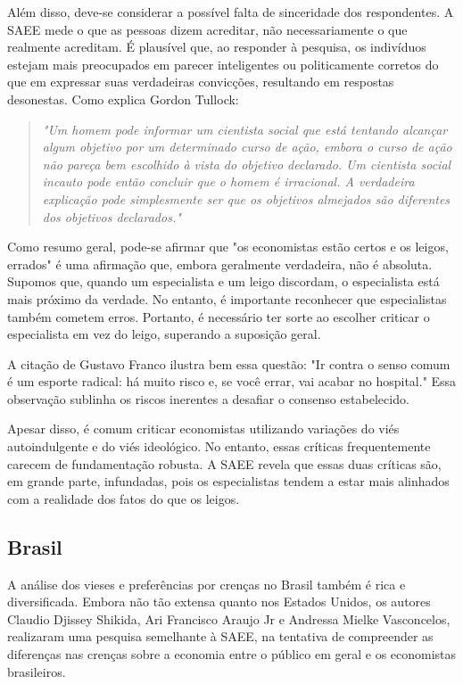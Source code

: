 Além disso, deve-se considerar a possível falta de sinceridade dos respondentes. A SAEE mede o que as pessoas dizem acreditar, não necessariamente o que realmente acreditam. É plausível que, ao responder à pesquisa, os indivíduos estejam mais preocupados em parecer inteligentes ou politicamente corretos do que em expressar suas verdadeiras convicções, resultando em respostas desonestas. Como explica Gordon Tullock:

\begin{quote}
    \textit{
        "Um homem pode informar um cientista social que está tentando alcançar algum objetivo por um determinado curso de ação, embora o curso de ação não pareça bem escolhido à vista do objetivo declarado. Um cientista social incauto pode então concluir que o homem é irracional. A verdadeira explicação pode simplesmente ser que os objetivos almejados são diferentes dos objetivos declarados."
    }
    \cite{tullock1987politics}
\end{quote}

Como resumo geral, pode-se afirmar que "os economistas estão certos e os leigos, errados" é uma afirmação que, embora geralmente verdadeira, não é absoluta. Supomos que, quando um especialista e um leigo discordam, o especialista está mais próximo da verdade. No entanto, é importante reconhecer que especialistas também cometem erros. Portanto, é necessário ter sorte ao escolher criticar o especialista em vez do leigo, superando a suposição geral.

A citação de Gustavo Franco ilustra bem essa questão: "Ir contra o senso comum é um esporte radical: há muito risco e, se você errar, vai acabar no hospital." Essa observação sublinha os riscos inerentes a desafiar o consenso estabelecido.

Apesar disso, é comum criticar economistas utilizando variações do viés autoindulgente e do viés ideológico. No entanto, essas críticas frequentemente carecem de fundamentação robusta. A SAEE revela que essas duas críticas são, em grande parte, infundadas, pois os especialistas tendem a estar mais alinhados com a realidade dos fatos do que os leigos.






\newpage

\subsection{Brasil}

A análise dos vieses e preferências por crenças no Brasil também é rica e diversificada. Embora não tão extensa quanto nos Estados Unidos, os autores Claudio Djissey Shikida, Ari Francisco Araujo Jr e Andressa Mielke Vasconcelos, realizaram uma pesquisa semelhante à SAEE, na tentativa de compreender as diferenças nas crenças sobre a economia entre o público em geral e os economistas brasileiros.

